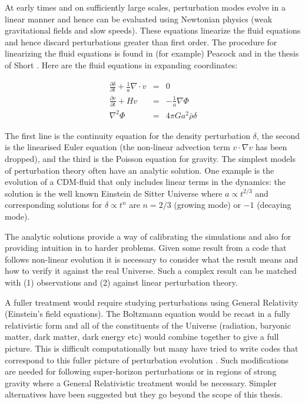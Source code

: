 At early times and on sufficiently large scales, perturbation modes evolve in a linear manner and hence can be evaluated using Newtonian physics (weak gravitational fields and slow speeds). These equations linearize the fluid equations and hence discard perturbations greater than first order. The procedure for linearizing the fluid equations is found in (for example) Peacock \citep{bib_pea} and in the thesis of Short \citep{bib_short}. Here are the fluid equations in  expanding coordinates:

\begin{eqnarray}
\label{eqn_linflu}
\frac{\partial \delta}{\partial t} + \frac{1}{a} \nabla \cdot v &=& 0 \nonumber \\
\frac{\partial v}{\partial t} + H v &=& - \frac{1}{a} \nabla \Phi \nonumber \\
\nabla^2 \Phi &=& 4\pi G a^2 \bar\rho \delta
\end{eqnarray}

The first line is the continuity equation for the density perturbation $\delta$, the second is the linearised Euler equation (the non-linear advection term $v \cdot \nabla v$ has been dropped), and the third is the Poisson equation for gravity. The simplest models of perturbation theory often have an analytic solution. One example is the evolution of a CDM-fluid that only includes linear terms in the dynamics: the solution is the well known Einstein de Sitter Universe where $ a \propto t^{2/3}$ and corresponding solutions for $\delta \propto t^n$ are $n = 2/3$ (growing mode) or $-1$ (decaying mode).

The analytic solutions provide a way of calibrating the simulations and also for providing intuition in to harder problems. Given some result from a code that follows non-linear evolution it is necessary to consider what the result means and how to verify it against the real Universe. Such a complex result can be matched with (1) observations and (2) against linear perturbation theory.

A fuller treatment would require studying perturbations using General Relativity (Einstein's field equations). The Boltzmann equation would be recast in a fully relativistic form and all of the constituents of the Universe (radiation, baryonic matter, dark matter, dark energy etc) would combine together to give a full picture. This is difficult computationally but many have tried to write codes that correspond to this fuller picture of perturbation evolution \citep{bib_huw, bib_pea}. Such modifications are needed for following super-horizon perturbations or in regions of strong gravity where a General Relativistic treatment would be necessary. Simpler alternatives have been suggested but they go beyond the scope of this thesis.


